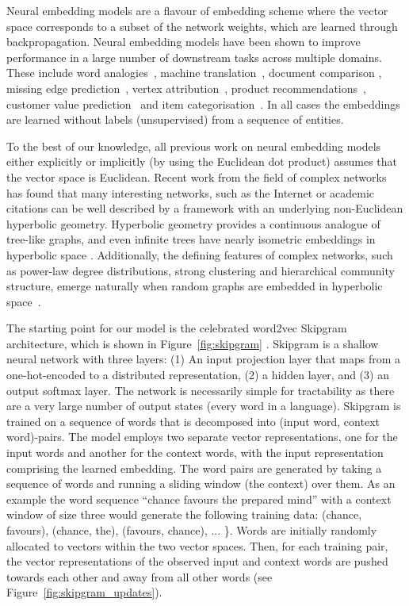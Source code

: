 \documentclass[sigconf, review]{acmart}
\begin{document}
Neural embedding models are a flavour of embedding scheme where the vector space corresponds to a subset of the network weights, which are learned through backpropagation.
Neural embedding models have been shown to improve performance in a large number of downstream tasks across multiple domains. These include word analogies~\cite{Mikolov2013, Mnih2013}, machine translation~\cite{Sutskever2014}, document comparison \cite{Kusner2015}, missing edge prediction~\cite{Grover}, vertex attribution~\cite{Perozzi2014}, product recommendations~\cite{Grbovic2015, Baeza-yates2015}, customer value prediction~\cite{Kooti2017, Chamberlain2017} and item categorisation~\cite{Barkan2016}. In all cases the embeddings are learned without labels (unsupervised) from a sequence of entities. 

To the best of our knowledge, all previous work on neural embedding models either explicitly or implicitly (by using the Euclidean dot product) assumes that the vector space is Euclidean. Recent work from the field of complex networks has found that many interesting networks, such as the Internet \cite{Boguna2010} or academic citations \cite{Clough2015a,Clough2016} can be well described by a framework with an underlying non-Euclidean hyperbolic geometry. Hyperbolic geometry provides a continuous analogue of tree-like graphs, and even infinite trees have nearly isometric embeddings in hyperbolic space \cite{Gromov}. Additionally, the defining features of complex networks, such as power-law degree distributions, strong clustering and hierarchical community structure, emerge naturally when random graphs are embedded in hyperbolic space~\cite{Krioukov}.

The starting point for our model is the celebrated word2vec Skipgram architecture, which is shown in Figure~\ref{fig:skipgram} \cite{Mikolov2013,Mikolov2013a}. Skipgram is a shallow neural network with three layers: (1) An input projection layer that maps from a one-hot-encoded to a distributed representation, (2) a hidden layer, and (3) an output softmax layer. The network is necessarily simple for tractability as there are a very large number of output states (every word in a language). 
Skipgram is trained on a sequence of words that is decomposed into (input word, context word)-pairs. The model employs two separate vector representations, one for the input words and another for the context words, with the input representation comprising the learned embedding. The word pairs are generated by taking a sequence of words and running a sliding window (the context) over them. As an example the word sequence ``chance favours the prepared mind'' with a context window of size three would generate the following training data: (chance, favours), (chance, the), (favours, chance), ... \}. Words are initially randomly allocated to vectors within the two vector spaces. Then, for each training pair, the vector representations of the observed input and context words are pushed towards each other and away from all other words (see Figure~\ref{fig:skipgram_updates}). 
\end{document}
